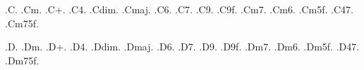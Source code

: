 \def\chXFlatTwoParams#1#2#3{\chBase{#1\lower-1.1ex\hbox{\chFlat}\kern-0.3em\hbox{\chFontRm #2}\lower-1ex\hbox{\chFontIdx #3}}}
\def\chXFlatmSeven#1{\chXFlatTwoParams{#1}{m}{7}}
\def\chXFlatmSix#1{\chXFlatTwoParams{#1}{m}{6}}
\def\chXFlatmFiveFlat#1{\chXFlatTwoParams{#1}{m}{5\chFlat}}
\def\chXFlatSusSeven#1{\chXFlatTwoParams{#1}{sus}{7}}

\def\chXFlatmSevenFiveFlat#1{\chBase{#1\lower-1.1ex\hbox{\chFlat}\kern-0.3em{\chFontRm m\lower0.5ex\vbox{\baselineskip=1ex\hbox{\chFontIdx 7}\hbox{\chFontIdx 5\chFlat}}}}}

%
%
\def\chXSharp#1{\chXOneParamUpper{#1}{\chSharp}}

\def\chXSharpOneParam#1#2{\chBase{#1\lower-1.4ex\hbox{\chSharp}\kern-0.3em\hbox{\chFontRm #2}}}
\def\chXSharpm#1{\chXSharpOneParam{#1}{m}}
\def\chXSharpPlus#1{\chXSharpOneParam{#1}{+}}
\def\chXSharpSus#1{\chXSharpOneParam{#1}{sus}}
\def\chXSharpDim#1{\chXSharpOneParam{#1}{\chDim}}
\def\chXSharpMaj#1{\chXSharpOneParam{#1}{\chMaj}}


\def\chXSharpOneParamUpper#1#2{\chXOneParamUpper{#1}{\chFontIdx\chSharp\kern 0.2ex#2}}
\def\chXSharpSix#1{\chXSharpOneParamUpper{#1}{6}}
\def\chXSharpSeven#1{\chXSharpOneParamUpper{#1}{7}}
\def\chXSharpNine#1{\chXSharpOneParamUpper{#1}{9}}
\def\chXSharpNineFlat#1{\chXSharpOneParamUpper{#1}{9\chFlat}}

\def\chXSharpTwoParams#1#2#3{\chBase{#1\lower-1.4ex\hbox{\chSharp}\kern-0.3em\hbox{\chFontRm #2}\lower-1ex\hbox{\chFontIdx #3}}}
\def\chXSharpmSeven#1{\chXSharpTwoParams{#1}{m}{7}}
\def\chXSharpmSix#1{\chXSharpTwoParams{#1}{m}{6}}
\def\chXSharpmFiveFlat#1{\chXSharpTwoParams{#1}{m}{5\chFlat}}
\def\chXSharpSusSeven#1{\chXSharpTwoParams{#1}{sus}{7}}

\def\chXSharpmSevenFiveFlat#1{\chBase{#1\lower-1.4ex\hbox{\chSharp}\kern-0.3em{\chFontRm m\lower0.5ex\vbox{\baselineskip=1ex\hbox{\chFontIdx 7}\hbox{\chFontIdx 5\chFlat}}}}}

%
%
.C.{}
.Cm.{}
.C+.{}
.C4.{}
.Cdim.{}
.Cmaj.{}
.C6.{}
.C7.{}
.C9.{}
.C9f.{}
.Cm7.{}
.Cm6.{}
.Cm5f.{}
.C47.{}
.Cm75f.{}

%
%
.D.{}
.Dm.{}
.D+.{}
.D4.{}
.Ddim.{}
.Dmaj.{}
.D6.{}
.D7.{}
.D9.{}
.D9f.{}
.Dm7.{}
.Dm6.{}
.Dm5f.{}
.D47.{}
.Dm75f.{}

